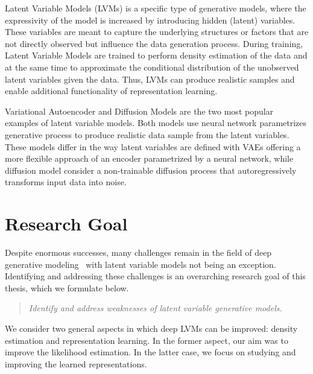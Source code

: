 Latent Variable Models (LVMs) is a specific type of generative models, where the expressivity of the model is increased by introducing hidden (latent) variables.
These variables are meant to capture the underlying structures or factors that are not directly observed but influence the data generation process.
During training, Latent Variable Models are trained to perform density estimation of the data and at the same time to
approximate the conditional distribution of the unobserved latent variables given the data. 
Thus, LVMs can produce realistic samples and enable additional functionality of representation learning. 

Variational Autoencoder and Diffusion Models are the two most popular examples of latent variable models. Both models use neural network parametrizes generative process to produce realistic data sample from the latent variables. 
These models differ in the way latent variables are defined with VAEs offering a more flexible approach of an encoder parametrized by a neural network, while diffusion model consider a non-trainable diffusion process that autoregressively transforms input data into noise. 





\section{Research Goal}
Despite enormous successes, many challenges remain in the field of deep generative modeling~\citep{manduchi2024challenges} with latent variable models not being an exception. 
Identifying and addressing these challenges is an overarching research goal of this thesis, which we formulate below.

\begin{quote}
\normalsize\itshape \noindent 
Identify and address weaknesses of latent variable generative models.
\end{quote}

We consider two general aspects in which deep LVMs can be improved: density estimation and representation learning. In the former aspect, our aim was to improve the likelihood estimation. In the latter case, we focus on studying and improving the learned representations. 

